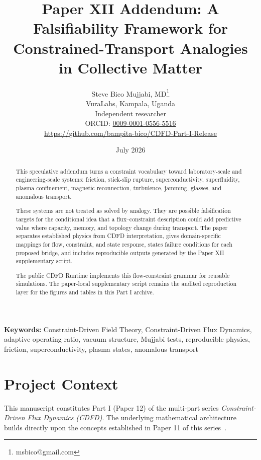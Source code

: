 \documentclass[11pt]{article}
\begin{document}
\title{Paper XII Addendum: A Falsifiability Framework for Constrained-Transport Analogies in Collective Matter}

\author{Steve Bico Mujjabi, MD\thanks{msbico@gmail.com}\\
VuraLabs, Kampala, Uganda\\
Independent researcher\\
ORCID: \href{https://orcid.org/0009-0001-0556-5516}{0009-0001-0556-5516}\\
\url{https://github.com/bampita-bico/CDFD-Part-I-Release}}

\date{July 2026}

\maketitle

\begin{abstract}
This speculative addendum turns a constraint vocabulary toward laboratory-scale
and engineering-scale systems: friction,
stick-slip rupture, superconductivity, superfluidity, plasma confinement,
magnetic reconnection, turbulence, jamming, glasses, and anomalous transport.

These systems are not treated as solved by analogy. They are possible
falsification targets for the conditional idea that a flux--constraint
description could add predictive value where capacity, memory, and topology
change during transport. The paper separates established physics from CDFD
interpretation, gives domain-specific mappings for flow, constraint, and state
response, states failure conditions for each proposed bridge, and includes
reproducible outputs generated by the Paper XII supplementary script.

The public CDFD Runtime implements this flow-constraint grammar for reusable
simulations. The paper-local supplementary script remains the audited
reproduction layer for the figures and tables in this Part I archive.
\end{abstract}

\noindent\textbf{Keywords:} Constraint-Driven Field Theory, Constraint-Driven Flux Dynamics, adaptive operating ratio, vacuum structure, Mujjabi tests, reproducible physics, friction, superconductivity, plasma states, anomalous transport

\vspace{0.75em}
\linenumbers

\section*{Project Context}
This manuscript constitutes Part I (Paper 12) of the multi-part series
\textit{Constraint-Driven Flux Dynamics (CDFD)}. The underlying mathematical
architecture builds directly upon the concepts established in Paper 11 of this
series~\cite{MujjabiXI2026}.
\end{document}

